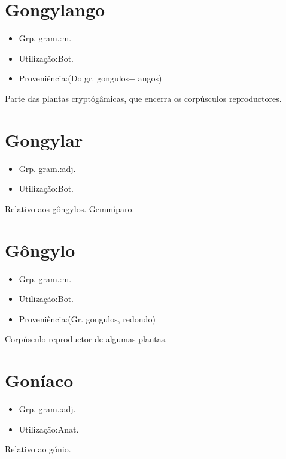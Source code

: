 \section{Gongylango}
\begin{itemize}
\item {Grp. gram.:m.}
\end{itemize}
\begin{itemize}
\item {Utilização:Bot.}
\end{itemize}
\begin{itemize}
\item {Proveniência:(Do gr. \textunderscore gongulos\textunderscore  + \textunderscore angos\textunderscore )}
\end{itemize}
Parte das plantas cryptógâmicas, que encerra os corpúsculos reproductores.
\section{Gongylar}
\begin{itemize}
\item {Grp. gram.:adj.}
\end{itemize}
\begin{itemize}
\item {Utilização:Bot.}
\end{itemize}
Relativo aos gôngylos.
Gemmíparo.
\section{Gôngylo}
\begin{itemize}
\item {Grp. gram.:m.}
\end{itemize}
\begin{itemize}
\item {Utilização:Bot.}
\end{itemize}
\begin{itemize}
\item {Proveniência:(Gr. \textunderscore gongulos\textunderscore , redondo)}
\end{itemize}
Corpúsculo reproductor de algumas plantas.
\section{Goníaco}
\begin{itemize}
\item {Grp. gram.:adj.}
\end{itemize}
\begin{itemize}
\item {Utilização:Anat.}
\end{itemize}
Relativo ao gónio.
